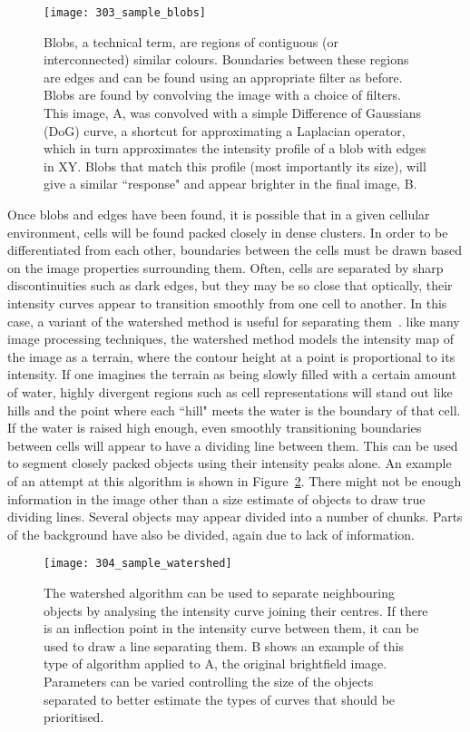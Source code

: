 \begin{figure}[h!]
 \centering
 \texttt{[image: 303\_sample\_blobs]}
 \caption[Sample of blob detection]{
 	Blobs, a technical term, are regions of contiguous (or interconnected) similar colours. Boundaries between these regions are edges and can be found using an appropriate filter as before. Blobs are found by convolving the image with a choice of filters. This image, A, was convolved with a simple Difference of Gaussians (DoG) curve, a shortcut for approximating a Laplacian operator, which in turn approximates the intensity profile of a blob with edges in XY. Blobs that match this profile (most importantly its size), will give a similar ``response" and appear brighter in the final image, B.
 }
 \label{fig:blob}
\end{figure}

Once blobs and edges have been found, it is possible that in a given cellular environment, cells will be found packed closely in dense clusters. In order to be differentiated from each other, boundaries between the cells must be drawn based on the image properties surrounding them. Often, cells are separated by sharp discontinuities such as dark edges, but they may be so close that optically, their intensity curves appear to transition smoothly from one cell to another. In this case, a variant of the watershed method is useful for separating them~\cite{Parvati:08}. like many image processing techniques, the watershed method models the intensity map of the image as a terrain, where the contour height at a point is proportional to its intensity. If one imagines the terrain as being slowly filled with a certain amount of water, highly divergent regions such as cell representations will stand out like hills and the point where each ``hill" meets the water is the boundary of that cell. If the water is raised high enough, even smoothly transitioning boundaries between cells will appear to have a dividing line between them. This can be used to segment closely packed objects using their intensity peaks alone. An example of an attempt at this algorithm is shown in Figure~\ref{fig:watershed}. There might not be enough information in the image other than a size estimate of objects to draw true dividing lines. Several objects may appear divided into a number of chunks. Parts of the background have also be divided, again due to lack of information.

\begin{figure}[h!]
 \centering
 \texttt{[image: 304\_sample\_watershed]}
 \caption[Watershed example]{
 	The watershed algorithm can be used to separate neighbouring objects by analysing the intensity curve joining their centres. If there is an inflection point in the intensity curve between them, it can be used to draw a line separating them. B shows an example of this type of algorithm applied to A, the original brightfield image. Parameters can be varied controlling the size of the objects separated to better estimate the types of curves that should be prioritised.
 }
 \label{fig:watershed}
\end{figure}

